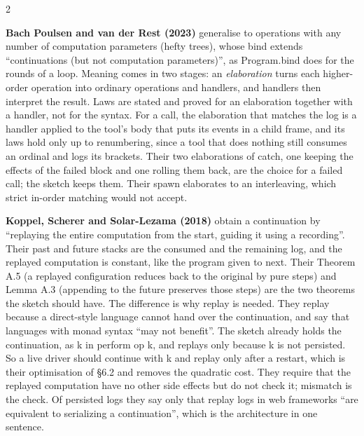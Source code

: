 \documentclass{article}
\newcommand{\topic}[1]{\par\medskip{\bfseries\normalsize #1}\par\smallskip}
\newcommand{\paper}[1]{\par\smallskip\textbf{#1}\quad}
\newcommand{\cd}[1]{{\ttfamily #1}}
\begin{document}
\begin{multicols}{2}
\paper{Bach Poulsen and van der Rest (2023)} generalise to operations with any number of
computation parameters (hefty trees), whose bind extends ``continuations (but not computation
parameters)'', as \cd{Program.bind} does for the rounds of a loop. Meaning comes in two stages: an \emph{elaboration}
turns each higher-order operation into ordinary operations and handlers, and handlers then
interpret the result. Laws are stated and proved for an elaboration together with a handler, not
for the syntax. For a \cd{call}, the elaboration that matches the log is a handler applied to
the tool's body that puts its events in a child frame, and its laws hold only up to renumbering,
since a tool that does nothing still consumes an ordinal and logs its brackets. Their two
elaborations of \cd{catch}, one keeping the effects of the failed block and one rolling them
back, are the choice for a failed call; the sketch keeps them. Their
\cd{spawn} elaborates to an interleaving, which strict in-order matching would not accept.

\topic{Replay}

\paper{Koppel, Scherer and Solar-Lezama (2018)} obtain a continuation by ``replaying the entire
computation from the start, guiding it using a recording''. Their past and future stacks are the
consumed and the remaining log, and the replayed computation is constant, like the program given
to \cd{next}. Their Theorem A.5 (a replayed configuration reduces back to the original by pure
steps) and Lemma A.3 (appending to the future preserves those steps) are the two theorems the
sketch should have. The difference is why replay is needed. They replay because a direct-style
language cannot hand over the continuation, and say that languages with monad syntax ``may not
benefit''. The sketch already holds the continuation, as \cd{k} in \cd{perform op k}, and replays
only because \cd{k} is not persisted. So a live driver should continue with \cd{k} and replay only
after a restart, which is their optimisation of \S6.2 and removes the quadratic cost. They require
that the replayed computation have no other side effects but do not check it; \cd{mismatch} is the
check. Of persisted logs they say only that replay logs in web frameworks ``are equivalent to
serializing a continuation'', which is the architecture in one sentence.


\end{multicols}
\end{document}
